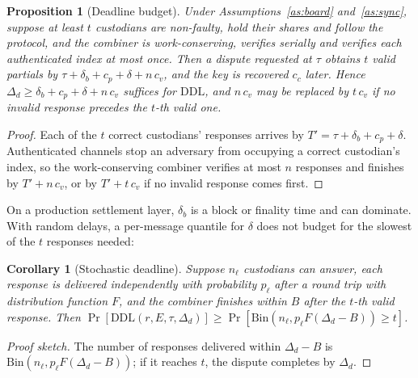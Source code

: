 \documentclass[Crown,sagev]{sagej}
\theoremstyle{plain}
\newtheorem{proposition}{Proposition}
\newtheorem{corollary}{Corollary}
\theoremstyle{definition}
\theoremstyle{remark}
\newcommand{\DDL}{\mathrm{DDL}}
\begin{document}
\begin{table}[t]
\caption{Exact operating characteristic: probability that an audit with sample size $s$ and threshold $q$ accepts when $k$ of $n=32$ custodians are ready ($t=22$, uniform sampling, Theorem~\ref{thm:fa}).}
\label{tab:oc}
\centering
\small

\end{table}

\begin{proposition}[Deadline budget]\label{prop:budget}
Under Assumptions~\ref{as:board} and~\ref{as:sync}, suppose at least $t$ custodians are non-faulty, hold their shares and follow the protocol, and the combiner is work-conserving, verifies serially and verifies each authenticated index at most once. Then a dispute requested at $\tau$ obtains $t$ valid partials by $\tau+\delta_b+c_p+\delta+n\,c_v$, and the key is recovered $c_c$ later. Hence $\Delta_d\ge\delta_b+c_p+\delta+n\,c_v$ suffices for $\DDL$, and $n\,c_v$ may be replaced by $t\,c_v$ if no invalid response precedes the $t$-th valid one.
\end{proposition}

\begin{proof}
Each of the $t$ correct custodians' responses arrives by $T'=\tau+\delta_b+c_p+\delta$. Authenticated channels stop an adversary from occupying a correct custodian's index, so the work-conserving combiner verifies at most $n$ responses and finishes by $T'+n\,c_v$, or by $T'+t\,c_v$ if no invalid response comes first.
\end{proof}

On a production settlement layer, $\delta_b$ is a block or finality time and can dominate. With random delays, a per-message quantile for $\delta$ does not budget for the slowest of the $t$ responses needed:

\begin{corollary}[Stochastic deadline]\label{cor:os}
Suppose $n_\ell$ custodians can answer, each response is delivered independently with probability $p_\ell$ after a round trip with distribution function $F$, and the combiner finishes within $B$ after the $t$-th valid response. Then $\Pr[\DDL(r,E,\tau,\Delta_d)]\ge\Pr[\mathrm{Bin}(n_\ell,p_\ell F(\Delta_d-B))\ge t]$.
\end{corollary}

\begin{proof}[Proof sketch]
The number of responses delivered within $\Delta_d-B$ is $\mathrm{Bin}(n_\ell,p_\ell F(\Delta_d-B))$; if it reaches $t$, the dispute completes by $\Delta_d$.
\end{proof}
\end{document}
